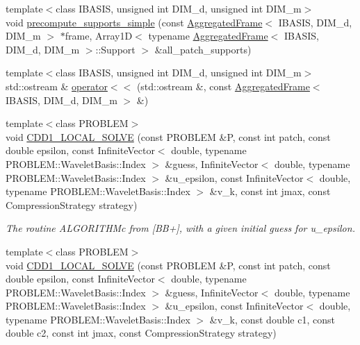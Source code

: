 \begin{CompactItemize}
\item 
{\footnotesize template$<$class IBASIS, unsigned int DIM\_\-d, unsigned int DIM\_\-m$>$ }\\void \hyperlink{namespaceFrameTL_d92777b6b7c3d1dc873761d9280ec994}{precompute\_\-supports\_\-simple} (const \hyperlink{classFrameTL_1_1AggregatedFrame}{AggregatedFrame}$<$ IBASIS, DIM\_\-d, DIM\_\-m $>$ $\ast$frame, Array1D$<$ typename \hyperlink{classFrameTL_1_1AggregatedFrame}{AggregatedFrame}$<$ IBASIS, DIM\_\-d, DIM\_\-m $>$::Support $>$ \&all\_\-patch\_\-supports)
\item 
{\footnotesize template$<$class IBASIS, unsigned int DIM\_\-d, unsigned int DIM\_\-m$>$ }\\std::ostream \& \hyperlink{namespaceFrameTL_218a9a8d5b69562375139a49043fce0b}{operator$<$$<$} (std::ostream \&, const \hyperlink{classFrameTL_1_1AggregatedFrame}{AggregatedFrame}$<$ IBASIS, DIM\_\-d, DIM\_\-m $>$ \&)
\item 
{\footnotesize template$<$class PROBLEM$>$ }\\void \hyperlink{namespaceFrameTL_8a92efb82d1634c8cf05737d5164b731}{CDD1\_\-LOCAL\_\-SOLVE} (const PROBLEM \&P, const int patch, const double epsilon, const InfiniteVector$<$ double, typename PROBLEM::WaveletBasis::Index $>$ \&guess, InfiniteVector$<$ double, typename PROBLEM::WaveletBasis::Index $>$ \&u\_\-epsilon, const InfiniteVector$<$ double, typename PROBLEM::WaveletBasis::Index $>$ \&v\_\-k, const int jmax, const CompressionStrategy strategy)
\begin{CompactList}\small\item\em The routine ALGORITHMc from \mbox{[}BB+\mbox{]}, with a given initial guess for u\_\-epsilon. \item\end{CompactList}\item 
\hypertarget{namespaceFrameTL_f1d8dd5608d705fbf2563b8a266d14a9}{
{\footnotesize template$<$class PROBLEM$>$ }\\void \hyperlink{namespaceFrameTL_f1d8dd5608d705fbf2563b8a266d14a9}{CDD1\_\-LOCAL\_\-SOLVE} (const PROBLEM \&P, const int patch, const double epsilon, const InfiniteVector$<$ double, typename PROBLEM::WaveletBasis::Index $>$ \&guess, InfiniteVector$<$ double, typename PROBLEM::WaveletBasis::Index $>$ \&u\_\-epsilon, const InfiniteVector$<$ double, typename PROBLEM::WaveletBasis::Index $>$ \&v\_\-k, const double c1, const double c2, const int jmax, const CompressionStrategy strategy)}
\label{namespaceFrameTL_f1d8dd5608d705fbf2563b8a266d14a9}


\end{CompactItemize}
